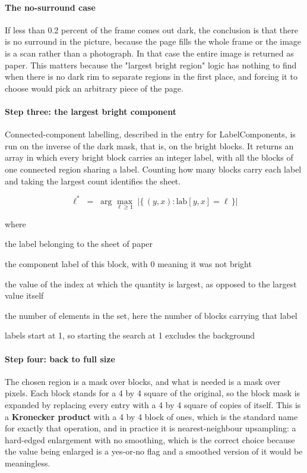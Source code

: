 \paragraph{The no-surround case}
If less than 0.2 percent of the frame comes out dark, the conclusion is that there is no surround in the picture, because the page fills the whole frame or the image is a scan rather than a photograph. In that case the entire image is returned as paper. This matters because the "largest bright region" logic has nothing to find when there is no dark rim to separate regions in the first place, and forcing it to choose would pick an arbitrary piece of the page.


\paragraph{Step three: the largest bright component}
Connected-component labelling, described in the entry for LabelComponents, is run on the inverse of the dark mask, that is, on the bright blocks. It returns an array in which every bright block carries an integer label, with all the blocks of one connected region sharing a label. Counting how many blocks carry each label and taking the largest count identifies the sheet.


\begin{equation}
\ell^{*} \;=\; \arg\max_{\ell \ge 1} \;\big|\{\,(y,x) : \mathrm{lab}[y,x] = \ell \,\}\big|
\end{equation}

\noindent where
\begin{description}[leftmargin=2.4em,style=nextline,font=\normalfont\ttfamily]\setlength\itemsep{1pt}
  \item[{$\ell^{*}$}] \normalfont the label belonging to the sheet of paper
  \item[{$\mathrm{lab}[y,x]$}] \normalfont the component label of this block, with 0 meaning it was not bright
  \item[{$\arg\max$}] \normalfont the value of the index at which the quantity is largest, as opposed to the largest value itself
  \item[{$|\{\cdot\}|$}] \normalfont the number of elements in the set, here the number of blocks carrying that label
  \item[{$\ell \ge 1$}] \normalfont labels start at 1, so starting the search at 1 excludes the background
\end{description}

\paragraph{Step four: back to full size}
The chosen region is a mask over blocks, and what is needed is a mask over pixels. Each block stands for a 4 by 4 square of the original, so the block mask is expanded by replacing every entry with a 4 by 4 square of copies of itself. This is a \textbf{Kronecker product} with a 4 by 4 block of ones, which is the standard name for exactly that operation, and in practice it is nearest-neighbour upsampling: a hard-edged enlargement with no smoothing, which is the correct choice because the value being enlarged is a yes-or-no flag and a smoothed version of it would be meaningless.


